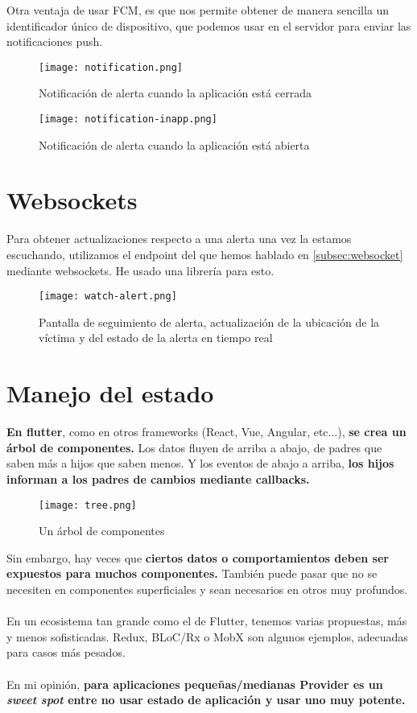 Otra ventaja de usar FCM, es que nos permite obtener de manera sencilla un identificador único de dispositivo, que podemos usar en el servidor para enviar las notificaciones push.

\begin{figure}[H]
	\centering	
	\texttt{[image: notification.png]}
	\caption{Notificación de alerta cuando la aplicación está cerrada}
	\end{figure}

\begin{figure}[H]
	\centering	
	\texttt{[image: notification-inapp.png]}
	\caption{Notificación de alerta cuando la aplicación está abierta}
	\end{figure}

\section{Websockets}

Para obtener actualizaciones respecto a una alerta una vez la estamos escuchando, utilizamos el endpoint del que hemos hablado en \ref{subsec:websocket} mediante websockets.
He usado una librería \cite{websocketchannel} para esto.

\begin{figure}[H]
	\centering	
	\texttt{[image: watch-alert.png]}
	\caption{Pantalla de seguimiento de alerta, actualización de la ubicación de la víctima y del estado de la alerta en tiempo real}
	\end{figure}

\section{Manejo del estado}
\textbf{En flutter}, como en otros frameworks (React, Vue, Angular, etc...), \textbf{se crea un árbol de componentes.}
Los datos fluyen de arriba a abajo, de padres que saben más a hijos que saben
menos. Y los eventos de abajo a arriba, \textbf{los hijos informan a los padres de cambios mediante callbacks.}
\begin{figure}[H]
	\centering	
	\texttt{[image: tree.png]}
	\caption{Un árbol de componentes}
	\end{figure}
Sin embargo, hay veces que \textbf{ciertos datos o comportamientos deben ser
expuestos para muchos componentes.} También puede pasar que no se necesiten
en componentes superficiales y sean necesarios en otros muy profundos. \\ \\
En un ecosistema tan grande como el de Flutter, tenemos varias propuestas, más y
menos sofisticadas. Redux, BLoC/Rx o MobX son algunos ejemplos, adecuadas
para casos más pesados.\\ \\
En mi opinión, \textbf{para aplicaciones pequeñas/medianas Provider es un \textit{sweet spot}
entre no usar estado de aplicación y usar uno muy potente.} \\ \\

